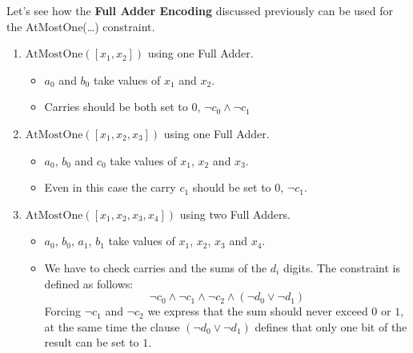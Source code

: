 Let's see how the \textbf{Full Adder Encoding} discussed previously can be used for the AtMostOne(\dots) constraint.
\begin{enumerate}
    \item $\text{AtMostOne}([x_1, x_2])$ using one Full Adder.
    \begin{itemize}
        \renewcommand{\labelitemi}{-}
        \item $a_0$ and $b_0$ take values of $x_1$ and $x_2$.
        \item Carries should be both set to $0$, $\neg c_0 \wedge \neg c_1$
    \end{itemize}
    \item $\text{AtMostOne}([x_1, x_2, x_3])$ using one Full Adder.
    \begin{itemize}
        \renewcommand{\labelitemi}{-}
        \item $a_0$, $b_0$ and $c_0$ take values of $x_1$, $x_2$ and $x_3$.
        \item Even in this case the carry $c_1$ should be set to $0$, $\neg c_1$.
    \end{itemize}
    \item $\text{AtMostOne}([x_1, x_2, x_3, x_4])$ using two Full Adders.
    \begin{itemize}
        \renewcommand{\labelitemi}{-}
        \item $a_0$, $b_0$, $a_1$, $b_1$ take values of $x_1$, $x_2$, $x_3$ and $x_4$.
        \item We have to check carries and the sums of the $d_i$ digits. The constraint is defined as follows: 
        $$\neg c_0 \wedge \neg c_1 \wedge \neg c_2 \wedge (\neg d_0 \vee \neg d_1)$$ 
        Forcing $\neg c_1$ and $\neg c_2$ we express that the sum should never exceed $0$ or $1$, at the same time the clause $(\neg d_0 \vee 
        \neg d_1)$ defines that only one bit of the result can be set to $1$.
    \end{itemize}
\end{enumerate}